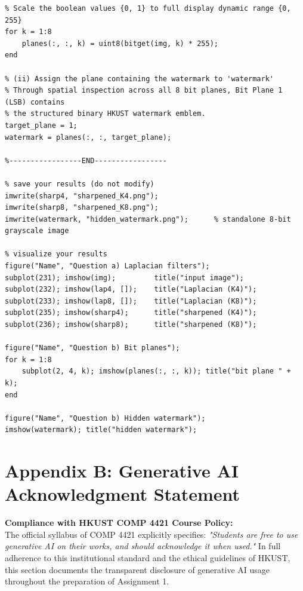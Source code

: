 \documentclass[11pt,a4paper]{article}
\begin{document}
\begin{lstlisting}[caption={Complete and unabridged implementation of \texttt{problem6.m}.}]
% (i) Deconstruct the 8-bit image into 8 binary bit planes
% Scale the boolean values {0, 1} to full display dynamic range {0, 255}
for k = 1:8
    planes(:, :, k) = uint8(bitget(img, k) * 255);
end

% (ii) Assign the plane containing the watermark to 'watermark'
% Through spatial inspection across all 8 bit planes, Bit Plane 1 (LSB) contains
% the structured binary HKUST watermark emblem.
target_plane = 1;
watermark = planes(:, :, target_plane);

%-----------------END-----------------

% save your results (do not modify)
imwrite(sharp4, "sharpened_K4.png");
imwrite(sharp8, "sharpened_K8.png");
imwrite(watermark, "hidden_watermark.png");      % standalone 8-bit grayscale image

% visualize your results
figure("Name", "Question a) Laplacian filters");
subplot(231); imshow(img);         title("input image");
subplot(232); imshow(lap4, []);    title("Laplacian (K4)");
subplot(233); imshow(lap8, []);    title("Laplacian (K8)");
subplot(235); imshow(sharp4);      title("sharpened (K4)");
subplot(236); imshow(sharp8);      title("sharpened (K8)");

figure("Name", "Question b) Bit planes");
for k = 1:8
    subplot(2, 4, k); imshow(planes(:, :, k)); title("bit plane " + k);
end

figure("Name", "Question b) Hidden watermark");
imshow(watermark); title("hidden watermark");
\end{lstlisting}

\newpage
\section{Appendix B: Generative AI Acknowledgment Statement}
\label{sec:ai_acknowledgment}

\noindent\textbf{Compliance with HKUST COMP 4421 Course Policy:}\\
The official syllabus of COMP 4421 explicitly specifies: \textit{"Students are free to use generative AI on their works, and should acknowledge it when used."} In full adherence to this institutional standard and the ethical guidelines of HKUST, this section documents the transparent disclosure of generative AI usage throughout the preparation of Assignment 1.
\end{document}
